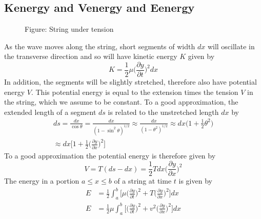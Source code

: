 \documentclass[../../../main.tex]{subfiles}
\begin{document}
\subsection{Kenergy and Venergy and Eenergy} 
\begin{figure}
    \centering
    \caption*{Figure: String under tension}
\end{figure}
As the wave moves along the string, short segments of width $dx$ will oscillate in the transverse direction and so will have kinetic energy $K$ given by
\begin{equation*}
    K=\frac{1}{2}\mu \biggl(\frac{\partial y}{\partial t}\biggr)^2 dx 
\end{equation*}
In addition, the segments will be slightly stretched, therefore also have potential energy $V$. This potential energy is equal to the extension times the tension $V$ in the string, which we assume to be constant. To a good approximation, the extended length of a segment $ds$ is related to the unstretched length $dx$ by
\begin{multline*}
    ds=\frac{dx}{\cos \theta}=\frac{dx}{(1-\sin^2\theta)^{1/2}}\approx \frac{dx}{(1-\theta^2)^{1/2}} \approx dx\biggl(1+\frac{1}{2}\theta^2\biggr) \\
    \approx dx\biggl[1+\frac{1}{2}\biggl(\frac{\partial y}{\partial x}\biggr)^2\biggr]
\end{multline*}
To a good approximation the potential energy is therefore given by
\begin{equation*}
    V=T(ds-dx)=\frac{1}{2}Tdx \biggl(\frac{\partial y}{\partial x}\biggr)^2
\end{equation*}
The energy in a portion $a \leq x \leq b$ of a string at time $t$ is given by
\begin{align*}
    E&=\frac{1}{2}\int_{a}^{b}\biggl[\mu \biggl(\frac{\partial y}{\partial t}\biggr)^2 + T \biggl(\frac{\partial y}{\partial x}\biggr)^2\biggr]dx\\
    E&=\frac{1}{2}\mu\int_{a}^{b}\biggl[ \biggl(\frac{\partial y}{\partial t}\biggr)^2 + v^2 \biggl(\frac{\partial y}{\partial x}\biggr)^2\biggr]dx\\
\end{align*}
\end{document}

